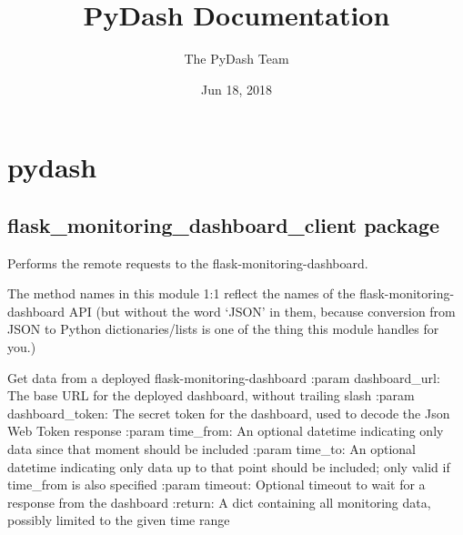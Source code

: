 \documentclass[letterpaper,10pt,english]{sphinxmanual}
\title{PyDash Documentation}
\date{Jun 18, 2018}
\author{The PyDash Team}
\begin{document}
\maketitle
\sphinxtableofcontents
{}\label{\detokenize{index::doc}}



\chapter{pydash}
\label{\detokenize{modules::doc}}\label{\detokenize{modules:pydash}}\label{\detokenize{modules:welcome-to-pydash-s-documentation}}

\section{flask\_monitoring\_dashboard\_client package}
\label{\detokenize{flask_monitoring_dashboard_client:flask-monitoring-dashboard-client-package}}\label{\detokenize{flask_monitoring_dashboard_client::doc}}\label{\detokenize{flask_monitoring_dashboard_client:module-flask_monitoring_dashboard_client}}
Performs the remote requests to the flask-monitoring-dashboard.

The method names in this module 1:1 reflect the names of the flask-monitoring-dashboard API
(but without the word ‘JSON’ in them, because conversion from JSON to Python dictionaries/lists
is one of the thing this module handles for you.)

\begin{fulllineitems}
\label{\detokenize{flask_monitoring_dashboard_client:flask_monitoring_dashboard_client.get_data}}
Get data from a deployed flask-monitoring-dashboard
:param dashboard\_url: The base URL for the deployed dashboard, without trailing slash
:param dashboard\_token: The secret token for the dashboard, used to decode the Json Web Token response
:param time\_from: An optional datetime indicating only data since that moment should be included
:param time\_to: An optional datetime indicating only data up to that point should be included;
only valid if time\_from is also specified
:param timeout: Optional timeout to wait for a response from the dashboard
:return: A dict containing all monitoring data, possibly limited to the given time range

\end{fulllineitems}
\end{document}
